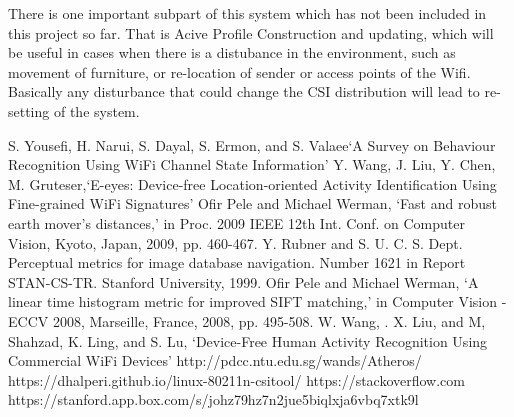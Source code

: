 \documentclass[letterpaper]{article}
\begin{document}
There is one important subpart of this system which has not been included in this project so far. That is Acive Profile Construction and updating, which will be useful in cases when there is a distubance in the environment, such as movement of furniture, or re-location of sender or access points of the Wifi. Basically any disturbance that could change the CSI distribution will lead to re-setting of the system. 

\begin{thebibliography}{99}
	
	 S. Yousefi, H. Narui, S. Dayal, S. Ermon, and S. Valaee`A Survey on Behaviour Recognition Using WiFi Channel State Information'
	 Y. Wang, J. Liu, Y. Chen, M. Gruteser,`E-eyes: Device-free Location-oriented Activity Identification Using Fine-grained WiFi Signatures'
	 Ofir Pele and Michael Werman, `Fast and robust earth mover's distances,' in Proc. 2009 IEEE 12th Int. Conf. on Computer Vision, Kyoto, Japan, 2009, pp. 460-467.
	 Y. Rubner and S. U. C. S. Dept. Perceptual metrics for image database navigation. Number 1621 in Report STAN-CS-TR. Stanford University, 1999.
	 Ofir Pele and Michael Werman, `A linear time histogram metric for improved SIFT matching,' in Computer Vision - ECCV 2008, Marseille, France, 2008, pp. 495-508.
	 W. Wang, . X. Liu, and M, Shahzad, K. Ling, and S. Lu, `Device-Free Human Activity Recognition Using Commercial WiFi Devices'
	 http://pdcc.ntu.edu.sg/wands/Atheros/
	 https://dhalperi.github.io/linux-80211n-csitool/
	 https://stackoverflow.com
	 https://stanford.app.box.com/s/johz79hz7n2jue5biqlxja6vbq7xtk9l
	
\end{thebibliography}
\end{document}
